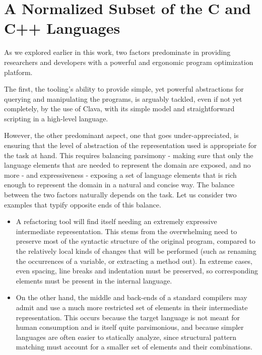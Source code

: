 \chapter{A Normalized Subset of the C and C++ Languages}\label{chap:subset}

As we explored earlier in this work, two factors predominate in providing researchers and developers with a powerful and ergonomic program optimization platform.

The first, the tooling's ability to provide simple, yet powerful abstractions for querying and manipulating the programs, is arguably tackled, even if not yet completely, by the use of Clava, with its simple model and straightforward scripting in a high-level language.

However, the other predominant aspect, one that goes under-appreciated, is ensuring that the level of abstraction of the representation used is appropriate for the task at hand. This requires balancing parsimony - making sure that only the language elements that are needed to represent the domain are exposed, and no more - and expressiveness - exposing a set of language elements that is rich enough to represent the domain in a natural and concise way. The balance between the two factors naturally depends on the task. Let us consider two  examples that typify opposite ends of this balance.

\begin{itemize}
    \item A refactoring tool will find itself needing an extremely expressive intermediate representation. This stems from the overwhelming need to preserve most of the syntactic structure of the original program, compared to the relatively local kinds of changes that will be performed (such as renaming the occurrences of a variable, or extracting a method out). In extreme cases, even spacing, line breaks and indentation must be preserved, so corresponding elements must be present in the internal language.
    \item On the other hand, the middle and back-ends of a standard compilers may admit and use a much more restricted set of elements in their intermediate representation. This occurs because the target language is not meant for human consumption and is itself quite parsimonious, and because simpler languages are often easier to statically analyze, since structural pattern matching must account for a smaller set of elements and their combinations.
\end{itemize}

